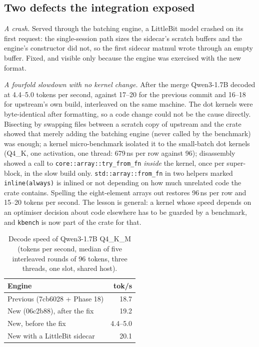 \subsection{Two defects the integration exposed}

\emph{A crash.} Served through the batching engine, a LittleBit model crashed on its first request: the single-session path sizes the sidecar's scratch
buffers and the engine's constructor did not, so the first sidecar matmul wrote through an empty buffer. Fixed, and visible only because the engine
was exercised with the new format.

\emph{A fourfold slowdown with no kernel change.} After the merge Qwen3-1.7B decoded at 4.4--5.0 tokens per second, against 17--20 for the previous
commit and 16--18 for upstream's own build, interleaved on the same machine. The dot kernels were byte-identical after formatting, so a code change
could not be the cause directly. Bisecting by swapping files between a scratch copy of upstream and the crate showed that merely adding the batching
engine (never called by the benchmark) was enough; a kernel micro-benchmark isolated it to the small-batch dot kernels (Q4\_K, one activation, one
thread: 679\,ns per row against 96); disassembly showed a call to \texttt{core::array::try\_from\_fn} \emph{inside} the kernel, once per super-block,
in the slow build only. \texttt{std::array::from\_fn} in two helpers marked \texttt{inline(always)} is inlined or not depending on how much unrelated
code the crate contains. Spelling the eight-element arrays out restores 96\,ns per row and 15--20 tokens per second. The lesson is general: a kernel
whose speed depends on an optimiser decision about code elsewhere has to be guarded by a benchmark, and \texttt{kbench} is now part of the crate for that.

\begin{table}[h]
\centering
\caption{Decode speed of Qwen3-1.7B Q4\_K\_M (tokens per second, median of five interleaved rounds of 96 tokens, three threads, one slot, shared host).}
\label{tab:phase19speed}
\begin{tabular}{lr}
\toprule
Engine & tok/s \\
\midrule
Previous (7cb6028 + Phase 18) & 18.7 \\
New (06c2b88), after the fix & 19.2 \\
New, before the fix & 4.4--5.0 \\
New with a LittleBit sidecar & 20.1 \\
\bottomrule
\end{tabular}
\end{table}

